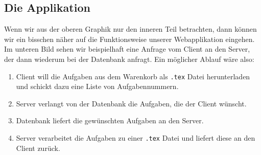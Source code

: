 \subsection{Die Applikation}

Wenn wir aus der oberen Graphik nur den inneren Teil betrachten, dann können wir ein bisschen näher auf die Funktionsweise unserer Webapplikation eingehen. Im unteren Bild sehen wir beispielhaft eine Anfrage vom Client an den Server, der dann wiederum bei der Datenbank anfragt.
Ein möglicher Ablauf wäre also:
\begin{enumerate}
    \item Client will die Aufgaben aus dem Warenkorb als \verb|.tex| Datei herunterladen und schickt dazu eine Liste von Aufgabennummern.
    \item Server verlangt von der Datenbank die Aufgaben, die der Client wünscht.
    \item Datenbank liefert die gewünschten Aufgaben an den Server.
    \item Server verarbeitet die Aufgaben zu einer \verb|.tex| Datei und liefert diese an den Client zurück.
\end{enumerate}